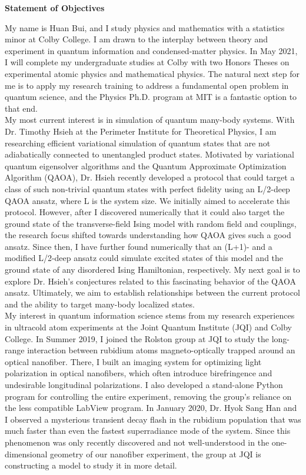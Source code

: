 \documentclass[12pt]{article}
\begin{document}
\begin{center}
	\textbf{Statement of Objectives}
\end{center}
My name is Huan Bui, and I study physics and mathematics with a statistics minor at Colby College. I am drawn to the interplay between theory and experiment in quantum information and condensed-matter physics.  In May 2021, I will complete my undergraduate studies at Colby with two Honors Theses on experimental atomic physics and mathematical physics. The natural next step for me is to apply my research training to address a fundamental open problem in quantum science, and the Physics Ph.D. program at MIT is a fantastic option to that end.  \\ 

My most current interest is in simulation of quantum many-body systems. With Dr. Timothy Hsieh at the Perimeter Institute for Theoretical Physics, I am researching efficient variational simulation of quantum states that are not adiabatically connected to unentangled product states. Motivated by variational quantum eigensolver algorithms and the Quantum Approximate Optimization Algorithm (QAOA), Dr. Hsieh recently developed a protocol that could target a class of such non-trivial quantum states with perfect fidelity using an L/2-deep QAOA ansatz, where L is the system size. We initially aimed to accelerate this protocol. However, after I discovered numerically that it could also target the ground state of the transverse-field Ising model with random field and couplings, the research focus shifted towards understanding how QAOA gives such a good ansatz. Since then, I have further found numerically that an (L+1)- and a modified L/2-deep ansatz could simulate excited states of this model and the ground state of any disordered Ising Hamiltonian, respectively. My next goal is to explore Dr. Hsieh's conjectures related to this fascinating behavior of the QAOA ansatz. Ultimately, we aim to establish relationships between the current protocol and the ability to target many-body localized states.\\

My interest in quantum information science stems from my research experiences in ultracold atom experiments at the Joint Quantum Institute (JQI) and Colby College. In Summer 2019, I joined the Rolston group at JQI to study the long-range interaction between rubidium atoms magneto-optically trapped around an optical nanofiber. There, I built an imaging system for optimizing light polarization in optical nanofibers, which often introduce birefringence and undesirable longitudinal polarizations. I also developed a stand-alone Python program for controlling the entire experiment, removing the group's reliance on the less compatible LabView program. In January 2020, Dr. Hyok Sang Han and I observed a mysterious transient decay flash in the rubidium population that was much faster than even the fastest superradiance mode of the system. Since this phenomenon was only recently discovered and not well-understood in the one-dimensional geometry of our nanofiber experiment, the group at JQI is constructing a model to study it in more detail.   \\ 
\end{document}
